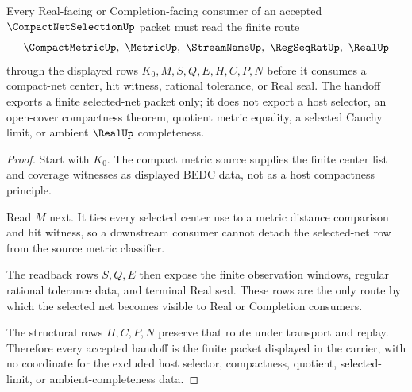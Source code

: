 \begin{theorem}
\label{thm:compact-net-selection-real-completion-handoff}
Every Real-facing or Completion-facing consumer of an accepted $\CompactNetSelectionUp$ packet must read the finite route
$$
\CompactMetricUp,\ \MetricUp,\ \StreamNameUp,\ \RegSeqRatUp,\ \RealUp
$$
through the displayed rows $K_0,M,S,Q,E,H,C,P,N$ before it consumes a compact-net center, hit witness, rational tolerance, or Real seal. The handoff exports a finite selected-net packet only; it does not export a host selector, an open-cover compactness theorem, quotient metric equality, a selected Cauchy limit, or ambient $\RealUp$ completeness.
\end{theorem}
\begin{proof}
Start with $K_0$. The compact metric source supplies the finite center list and coverage witnesses as displayed BEDC data, not as a host compactness principle.

Read $M$ next. It ties every selected center use to a metric distance comparison and hit witness, so a downstream consumer cannot detach the selected-net row from the source metric classifier.

The readback rows $S,Q,E$ then expose the finite observation windows, regular rational tolerance data, and terminal Real seal. These rows are the only route by which the selected net becomes visible to Real or Completion consumers.

The structural rows $H,C,P,N$ preserve that route under transport and replay. Therefore every accepted handoff is the finite packet displayed in the carrier, with no coordinate for the excluded host selector, compactness, quotient, selected-limit, or ambient-completeness data.
\end{proof}




